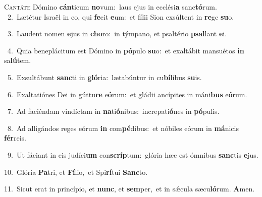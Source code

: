 \lettrine{\initial\textcolor{\initialcolor}{C}}{antáte} Dómino \textbf{cán}\-ticum \textbf{no}\-vum:~\star laus ejus in ecclési\textbf{a} sanc\-\textbf{tó}\-rum.\\
{\numbfont\textcolor{\numbcolor}{~2.}}~Lætétur Israël in eo, qui \textbf{fe}\-cit \textbf{e}\-um:~\star et fílii Sion exsúltent in \textbf{re}\-ge \textbf{su}\-o.\par
{\numbfont\textcolor{\numbcolor}{~3.}}~Laudent nomen \textbf{e}\-jus in \textbf{cho}\-ro:~\star in týmpano, et psaltério \textbf{psal}\-lant \textbf{e}\-i.\par
{\numbfont\textcolor{\numbcolor}{~4.}}~Quia beneplácitum est Dómino in \textbf{pó}\-pulo \textbf{su}\-o:~\star et exaltábit mansuétos \textbf{in} sa\-\textbf{lú}\-tem.\par
{\numbfont\textcolor{\numbcolor}{~5.}}~Exsultábunt \textbf{sanc}\-ti in \textbf{gló}\-ria:~\star lætabúntur in cu\-\textbf{bí}\-libus \textbf{su}\-is.\par
{\numbfont\textcolor{\numbcolor}{~6.}}~Exaltatiónes Dei in gúttu\textbf{re} e\-\textbf{ó}\-rum:~\star et gládii ancípites in máni\textbf{bus} e\-\textbf{ó}\-rum.\par
{\numbfont\textcolor{\numbcolor}{~7.}}~Ad faciéndam vindíctam in \textbf{na}\-ti\-\textbf{ó}\-nibus:~\star increpati\-\textbf{ó}\-nes in \textbf{pó}\-pulis.\par
{\numbfont\textcolor{\numbcolor}{~8.}}~Ad alligándos reges eórum \textbf{in} com\-\textbf{pé}\-dibus:~\star et nóbiles eórum in \textbf{má}\-nicis \textbf{fér}\-reis.\par
{\numbfont\textcolor{\numbcolor}{~9.}}~Ut fáciant in eis judíci\textbf{um} con\-\textbf{scríp}\-tum:~\star glória hæc est ómnibus \textbf{sanc}\-tis \textbf{e}\-jus.\par
{\numbfont\textcolor{\numbcolor}{10.}}~Glória \textbf{Pa}\-tri, et \textbf{Fí}\-lio,~\star et Spi\-\textbf{rí}\-tui \textbf{Sanc}\-to.\par
{\numbfont\textcolor{\numbcolor}{11.}}~Sicut erat in princípio, et \textbf{nunc}\-, et \textbf{sem}\-per,~\star et in sǽcula sæcu\-\textbf{ló}\-rum. \textbf{A}\-men.\par
